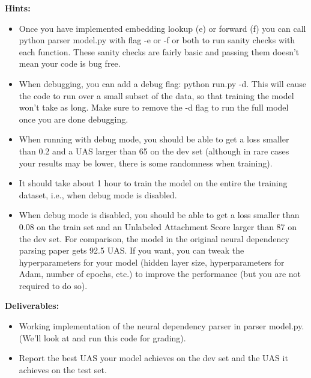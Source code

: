 \documentclass[a4 paper]{article}
\begin{document}
\textbf{Hints:}

\begin{itemize}
    \item Once you have implemented embedding lookup (e) or forward (f) you can call python parser model.py with ﬂag -e or -f or both to run sanity checks with each function.
    These sanity checks are fairly basic and passing them doesn’t mean your code is bug free.
    \item When debugging, you can add a debug ﬂag: python run.py -d.
    This will cause the code to run over a small subset of the data, so that training the model won’t take as long. Make sure to remove the -d ﬂag to run the full model once you are done debugging.
    \item When running with debug mode, you should be able to get a loss smaller than 0.2 and a UAS larger than 65 on the dev set (although in rare cases your results may be lower, there is some randomness when training).
    \item It should take about 1 hour to train the model on the entire the training dataset, i.e., when debug mode is disabled.
    \item When debug mode is disabled, you should be able to get a loss smaller than 0.08 on the train set and an Unlabeled Attachment Score larger than 87 on the dev set.
    For comparison, the model in the original neural dependency parsing paper gets 92.5 UAS.
    If you want, you can tweak the hyperparameters for your model (hidden layer size, hyperparameters for Adam, number of epochs, etc.) to improve the performance (but you are not required to do so).
\end{itemize}

\textbf{Deliverables:}

\begin{itemize}
    \item Working implementation of the neural dependency parser in parser model.py.
    (We’ll look at and run this code for grading).
    \item Report the best UAS your model achieves on the dev set and the UAS it achieves on the test set.
\end{itemize}
\end{document}
